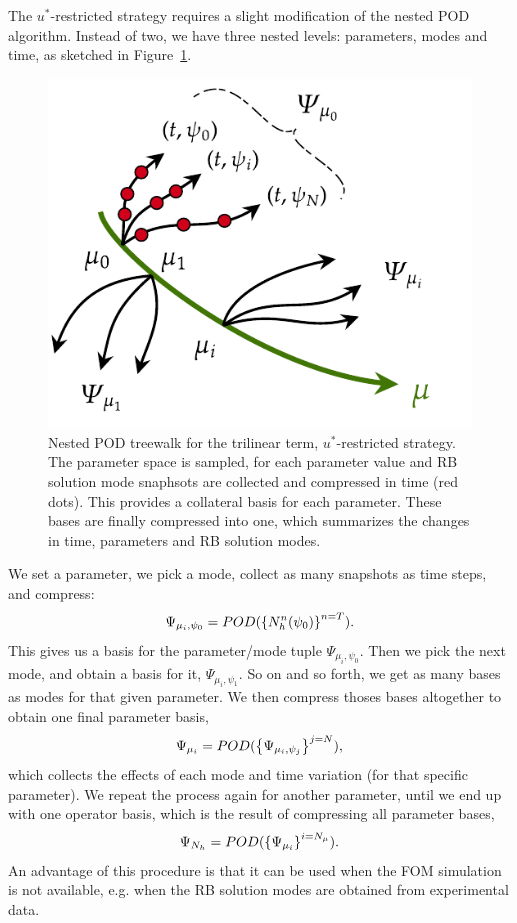 \documentclass[../../thesis.tex]{subfiles}
\begin{document}
The \mbox{$u^{*}$-restricted} strategy requires a slight modification of the nested POD algorithm.
Instead of two, we have three nested levels: 
parameters, modes and time, as sketched in Figure~\ref{fig:treewalk_trilinear_sketch}.
\begin{figure}[h]
    \centering
    \includegraphics[width=0.8\columnwidth]{research_project/piston/figures/treewalk-trilinear.pdf}
    \caption{Nested POD treewalk for the trilinear term, 
    \mbox{$u^{*}$-restricted} strategy.
    The parameter space is sampled, for each parameter value and RB solution mode 
    snaphsots are collected and compressed in time (red dots).
    This provides a collateral basis for each parameter.
    These bases are finally compressed into one, 
    which summarizes the changes in time, parameters and RB solution modes.}
    \label{fig:treewalk_trilinear_sketch}
\end{figure}

We set a parameter, we pick a mode, collect as many snapshots
as time steps, and compress:
\begin{equation}
    \Psi_{\mu_i, \psi_0} = POD(\qty{N^{n}_h(\psi_0)}^{n=T}).
\end{equation}
This gives us a basis for the parameter/mode tuple $\Psi_{\mu_i, \psi_0}$. 
Then we pick the next mode, and obtain a basis for it, $\Psi_{\mu_i, \psi_1}$.
So on and so forth, we get as many bases as modes for that given parameter.
We then compress thoses bases altogether to obtain one final parameter basis,
\begin{equation}
    \Psi_{\mu_i} = POD(\qty{\Psi_{\mu_i, \psi_j}}^{j=N}),
\end{equation}
which collects the effects of each mode and time variation (for that specific parameter).
We repeat the process again for another parameter, 
until we end up with one operator basis,
which is the result of compressing all parameter bases,
\begin{equation}
    \Psi_{N_h} = POD(\qty{\Psi_{\mu_i}}^{i=N_{\mu}}).
\end{equation}
An advantage of this procedure is that it can be used when 
the FOM simulation is not available, 
e.g. when the RB solution modes are obtained from experimental data.
\end{document}
